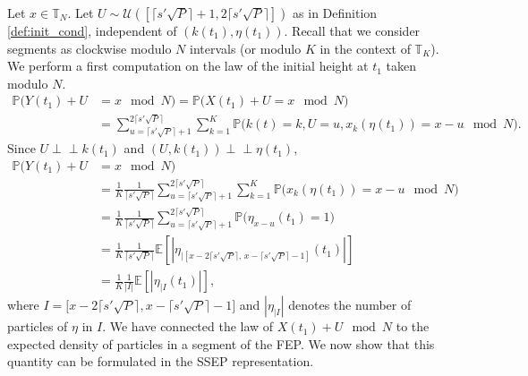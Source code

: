 \documentclass[11pt,a4paper]{article}
\newcommand{\E}{\mathbb{E}}
\newcommand{\T}{\mathbb{T}}
\newcommand{\PP}{\mathbb{P}}
\newcommand\entc[1]{\lceil #1 \rceil}
\begin{document}
Let $x \in \T_N$. Let $U \sim \mathcal{U}\left(\left[\entc{s'\sqrt{P}}+1, 2\entc{s'\sqrt{P}}\right]\right)$ as in Definition \ref{def:init_cond}, independent of $(k(t_1),\eta(t_1))$. Recall that we consider segments as clockwise modulo $N$ intervals (or modulo $K$ in the context of $\T_K$). We perform a first computation on the law of the initial height at $t_1$ taken modulo $N$.
\begin{align*}
\PP\big(Y(t_1) + U &= x \mod N\big) = \PP\big(X(t_1) + U = x \mod N\big)   \\
&= \!\sum_{u = \entc{s'\sqrt{P}}+1}^{2\entc{s'\sqrt{P}}} \sum_{k = 1}^K \PP\big(k(t)=k, U=u, x_k(\eta(t_1)) = x-u \!\mod N\big).
\end{align*}
Since $U \perp\!\!\!\perp k(t_1)$ and $\left(U,k(t_1)\right)\perp\!\!\!\perp \eta(t_1)$,
\begin{align}
\PP\big(Y(t_1) + U &= x \mod N\big) \nonumber\\
&=\frac{1}{K}\frac{1}{\entc{s'\sqrt{P}}}\sum_{u = \entc{s'\sqrt{P}}+1}^{2\entc{s'\sqrt{P}}} \sum_{k = 1}^K \PP\big(x_k(\eta(t_1)) = x-u \mod N\big)  \nonumber \\
&= \frac{1}{K}\frac{1}{\entc{s'\sqrt{P}}} \sum_{u = \entc{s'\sqrt{P}}+1}^{2\entc{s'\sqrt{P}}}  \PP\big(\eta_{x-u}(t_1) = 1\big) \nonumber \\
&= \frac{1}{K}\frac{1}{\entc{s'\sqrt{P}}} \E\left[|\eta_{|[x-2\entc{s'\sqrt{P}},\, x-\entc{s'\sqrt{P}}-1]}(t_1)|\right] \nonumber \\
&= \frac{1}{K}\frac{1}{|I|} \E\left[|\eta_{|I}(t_1)|\right], \label{eq:probI}
\end{align}
where $I = \big[x-2\entc{s'\sqrt{P}}, x-\entc{s'\sqrt{P}}-1\big]$ and $|\eta_{|I}|$ denotes the number of particles of $\eta$ in $I$. We have connected the law of $X(t_1)+U\mod N$ to the expected density of particles in a segment of the FEP. We now show that this quantity can be formulated in the SSEP representation.
\end{document}
